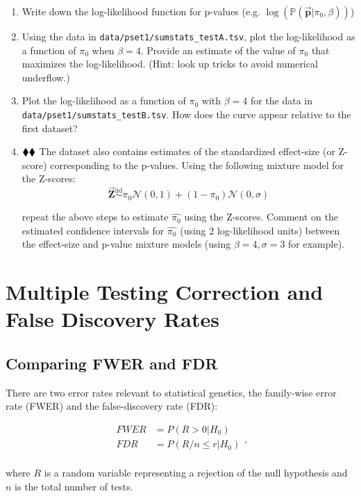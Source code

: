 \documentclass{pset}
\begin{document}
\begin{enumerate}
\item Write down the log-likelihood function for p-values (e.g. $\log (\mathbb{P}(\overrightarrow{\mathbf{p}} | \pi_0, \beta))$)
\item Using the data in \texttt{data/pset1/sumstats\_testA.tsv}, plot the log-likelihood as a function of $\pi_0$ when $\beta = 4$. Provide an estimate of the value of $\pi_0$ that maximizes the log-likelihood. (Hint: look up tricks to avoid numerical underflow.)
\item Plot the log-likelihood as a function of $\pi_0$ with $\beta = 4$ for the data in \texttt{data/pset1/sumstats\_testB.tsv}. How does the curve appear relative to the first dataset?
\item $\mathbin{\blacklozenge}\mathbin{\blacklozenge}$ The dataset also contains estimates of the standardized effect-size (or Z-score) corresponding to the p-values. Using the following mixture model for the Z-scores: 
$$\overrightarrow{\mathbf{Z}} \overset{\text{iid}}{\sim} \pi_0 \mathcal{N}(0,1) + (1 - \pi_0)\mathcal{N}(0,\sigma)$$

repeat the above steps to estimate $\hat{\pi_0}$ using the Z-scores. Comment on the estimated confidence intervals for $\hat{\pi_0}$ (using 2 log-likelihood units) between the effect-size and p-value mixture models (using $\beta=4,\sigma=3$ for example).

\end{enumerate}

\section*{Multiple Testing Correction and False Discovery Rates}

\subsection*{Comparing FWER and FDR}

There are two error rates relevant to statistical genetics, the family-wise error rate (FWER) and the false-discovery rate (FDR):

$$
\begin{aligned}
FWER &= P(R > 0 | H_0)\\
FDR &= P(R/n \leq r | H_0)\\
\end{aligned},
$$

where $R$ is a random variable representing a rejection of the null hypothesis and $n$ is the total number of tests. 
\end{document}
